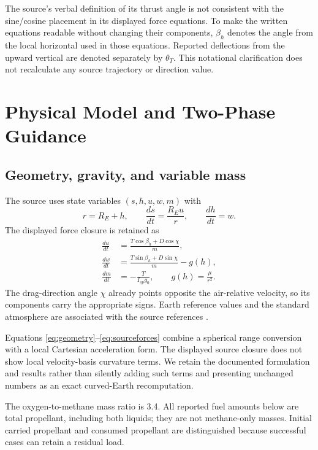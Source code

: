 \documentclass[11pt,a4paper]{article}
\begin{document}
The source's verbal definition of its thrust angle is not consistent with the sine/cosine placement in its displayed force equations. To make the written equations readable without changing their components, $\beta_h$ denotes the angle from the local horizontal used in those equations. Reported deflections from the upward vertical are denoted separately by $\theta_T$. This notational clarification does not recalculate any source trajectory or direction value.

\section{Physical Model and Two-Phase Guidance}
\subsection{Geometry, gravity, and variable mass}
The source uses state variables $(s,h,u,w,m)$ with
\begin{equation}
 r=R_E+h,\qquad \frac{ds}{dt}=\frac{R_Eu}{r},\qquad \frac{dh}{dt}=w.
\label{eq:geometry}
\end{equation}
The displayed force closure is retained as
\begin{align}
 \frac{du}{dt}&=\frac{T\cos\beta_h+D\cos\chi}{m},\\
 \frac{dw}{dt}&=\frac{T\sin\beta_h+D\sin\chi}{m}-g(h),\\
 \frac{dm}{dt}&=-\frac{T}{I_{sp}g_0},\qquad
 g(h)=\frac{\mu}{r^2}.
\label{eq:sourceforces}
\end{align}
The drag-direction angle $\chi$ already points opposite the air-relative velocity, so its components carry the appropriate signs. Earth reference values and the standard atmosphere are associated with the source references \cite{ussa,earth,iers}.

Equations \eqref{eq:geometry}--\eqref{eq:sourceforces} combine a spherical range conversion with a local Cartesian acceleration form. The displayed source closure does not show local velocity-basis curvature terms. We retain the documented formulation and results rather than silently adding such terms and presenting unchanged numbers as an exact curved-Earth recomputation.

The oxygen-to-methane mass ratio is 3.4. All reported fuel amounts below are total propellant, including both liquids; they are not methane-only masses. Initial carried propellant and consumed propellant are distinguished because successful cases can retain a residual load.
\end{document}
